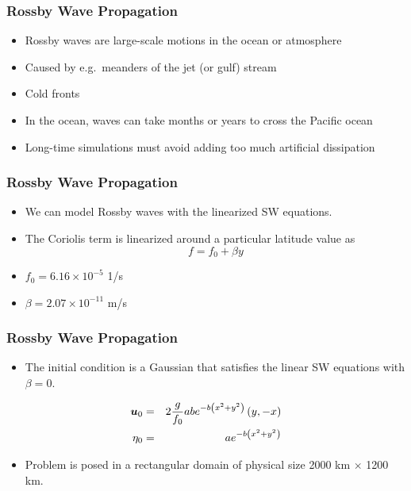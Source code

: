 \begin{frame}%
  \frametitle{Rossby Wave Propagation}
  \begin{itemize}[<+->]
  \item{Rossby waves are large-scale motions in the ocean or atmosphere}
  \item{Caused by e.g.\ meanders of the jet (or gulf) stream}
  \item{Cold fronts}
  \item{In the ocean, waves can take months or years to cross the Pacific ocean}
  \item{Long-time simulations must avoid adding too much artificial dissipation}
  \end{itemize}
\end{frame}


\begin{frame}%
  \frametitle{Rossby Wave Propagation}
  \begin{itemize}%
  \item{We can model Rossby waves with the linearized SW equations.}
  \item{The Coriolis term is linearized around a particular latitude value as
  \begin{equation}
    \nonumber
    f = f_0 + \beta y
  \end{equation}
  }
  \item{$f_0=6.16 \times 10^{-5}$ 1/s}
  \item{$\beta = 2.07 \times 10^{-11}$ m/s}
  \end{itemize}
\end{frame}

\begin{frame}%
  \frametitle{Rossby Wave Propagation}
  \begin{itemize}%
  \item{The initial condition is a Gaussian that satisfies the linear
    SW equations with $\beta=0$.
    }
  \end{itemize}
  \begin{eqnarray}
    \nonumber
    {\boldsymbol{u}}_0 &=&  2 \frac{g}{f_0} a b  e^{-b \left(x^2+y^2\right)}\left(y,-x\right) \\
    \nonumber
    \eta_0   &=&  a e^{-b \left(x^2+y^2\right)}
  \end{eqnarray}
  \begin{itemize}
    \item{Problem is posed in a rectangular domain of physical
      size 2000 km $\times$ 1200 km.
    }
  \end{itemize}
\end{frame}

